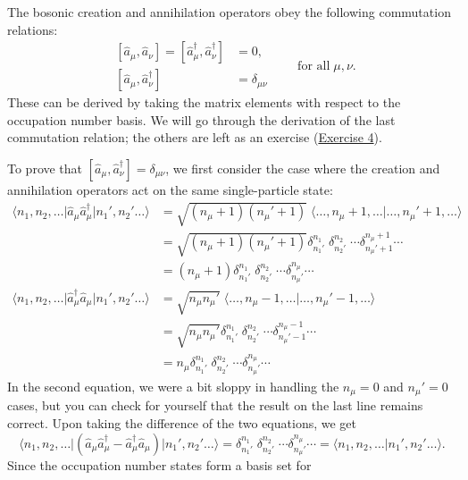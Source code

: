 \documentclass[pra,12pt]{revtex4}
\begin{document}
The bosonic creation and annihilation operators obey the following commutation
relations:
$$\boxed{\quad\begin{aligned}\,[\hat{a}_\mu,\hat{a}_\nu] = [\hat{a}_\mu^\dagger,\hat{a}_\nu^\dagger] &= 0, \\ \,[\hat{a}_\mu,\hat{a}_\nu^\dagger] &= \delta_{\mu\nu}\end{aligned}\qquad\textrm{for all}\;\mu,\nu.\quad}$$
These can be derived by taking the matrix elements with respect to the
occupation number basis.  We will go through the derivation of the
last commutation relation; the others are left as an exercise
(\hyperref[ex:boson_commutators]{Exercise 4}).

To prove that $[\hat{a}_\mu,\hat{a}_\nu^\dagger] = \delta_{\mu\nu}$, we first
consider the case where the creation and annihilation operators act on
the same single-particle state:
$$\begin{aligned}\big\langle n_1, n_2, \dots \big| \hat{a}_\mu \hat{a}_\mu^\dagger \big| n_1', n_2'\dots\big\rangle &= \sqrt{(n_\mu+1)(n_\mu'+1)}\; \big\langle \dots, n_\mu+1, \dots \big| \dots, n_\mu'+1, \dots\big\rangle \\ &= \sqrt{(n_\mu+1)(n_\mu'+1)} \delta^{n_1}_{n_1'} \; \delta^{n_2}_{n_2'} \; \cdots \delta^{n_\mu+1}_{n_\mu'+1}\cdots \\ &= (n_\mu+1) \delta^{n_1}_{n_1'} \; \delta^{n_2}_{n_2'} \; \cdots \delta^{n_\mu}_{n_\mu'}\cdots \\ \big\langle n_1, n_2, \dots \big| \hat{a}_\mu^\dagger \hat{a}_\mu \big| n_1', n_2'\dots\big\rangle &= \sqrt{n_\mu n_\mu'}\; \big\langle \dots, n_\mu-1, \dots \big| \dots, n_\mu'-1, \dots\big\rangle \\&= \sqrt{n_\mu n_\mu'} \delta^{n_1}_{n_1'} \; \delta^{n_2}_{n_2'} \; \cdots \delta^{n_\mu-1}_{n_\mu'-1}\cdots \\ &= n_\mu \delta^{n_1}_{n_1'} \; \delta^{n_2}_{n_2'} \; \cdots \delta^{n_\mu}_{n_\mu'}\cdots \end{aligned}$$
In the second equation, we were a bit sloppy in handling the $n_\mu =
0$ and $n_\mu' = 0$ cases, but you can check for yourself that the
result on the last line remains correct.  Upon taking the
difference of the two equations, we get
$$\big\langle n_1, n_2, \dots \big| \left(\hat{a}_\mu \hat{a}_\mu^\dagger - \hat{a}_\mu^\dagger \hat{a}_\mu\right) \big| n_1', n_2'\dots\big\rangle = \delta^{n_1}_{n_1'} \; \delta^{n_2}_{n_2'} \; \cdots \delta^{n_\mu}_{n_\mu'}\cdots = \big\langle n_1, n_2, \dots \big| n_1', n_2'\dots\big\rangle.$$
Since the occupation number states form a basis set for
\end{document}
